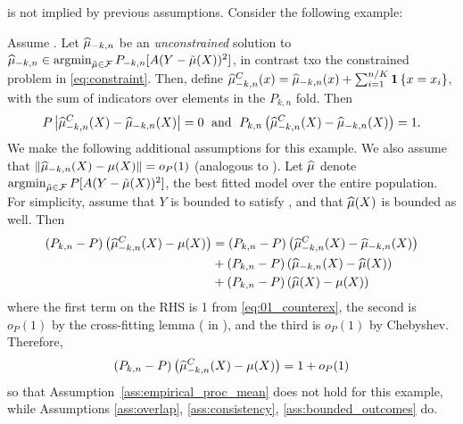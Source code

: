  is not implied by previous assumptions. Consider the following example: 

\begin{example}\label{ex:ass_D}
Assume .
Let $\widehat{\mu}_{-k,n}$ be an \emph{unconstrained} solution to
$\widehat{\mu}_{-k,n}\in \mathop{\rm argmin}_{\tilde\mu\in\mathcal F} P_{-k,n}[A(Y-\tilde \mu(X))^2]$,
in contrast txo the constrained problem in \eqref{eq:constraint}. 
Then, define 
$\widehat{\mu}^C_{-k,n}(x)=\widehat{\mu}_{-k,n}(x)+\sum_{i=1}^{n/K} \mathbf{1} \left\{x=x_i\right\}$, with the sum of indicators over elements in the $P_{k,n}$ fold.
Then 
\begin{align}
\label{eq:01_counterex}
    P\left|\widehat{\mu}^C_{-k,n}(X)-\widehat{\mu}_{-k,n}(X)\right|=0\;\text{ and } \;
P_{k,n}\left(\widehat{\mu}^C_{-k,n}(X)-\widehat{\mu}_{-k,n}(X)\right)=1.
\end{align}
We make the following additional assumptions for this example. 
We also assume that $\|\widehat{\mu}_{-k,n}(X)-\mu(X)\|=o_P(1)$ (analogous to ).
Let $\widehat{\mu}$ denote $\mathop{\rm argmin}_{\tilde \mu\in\mathcal F} P[A(Y-\tilde\mu(X))^2]$, the best fitted model over the entire population. For simplicity, assume that $Y$ is bounded to satisfy , and that $\widehat{\mu}(X)$ is bounded as well. Then
\vspace{-0.7em}
\begin{align*}
(P_{k,n}-P)\left(\widehat{\mu}^C_{-k,n}(X)-\mu(X)\right)&=
(P_{k,n}-P)\left(\widehat{\mu}^C_{-k,n}(X)-\widehat{\mu}_{-k,n}(X)\right)
\\&+
(P_{k,n}-P)\left(\widehat{\mu}_{-k,n}(X)-\widehat{\mu}(X)\right)\\
&+(P_{k,n}-P)\left(\widehat{\mu}(X)-\mu(X)\right)  
\end{align*}
where the first term on the RHS is 1 from \eqref{eq:01_counterex}, the second is $o_P(1)$ by the cross-fitting lemma ( in ), and the third is $o_P(1)$ by Chebyshev. 
Therefore, 
\vspace{-0.7em}
$$(P_{k,n}-P)\left(\widehat{\mu}^C_{-k,n}(X)-\mu(X)\right)=1+o_P(1)$$
so that 
Assumption~\ref{ass:empirical_proc_mean} does not hold for this example, while Assumptions \ref{ass:overlap}, \ref{ass:consistency}, \ref{ass:bounded_outcomes} do. 
\end{example}
\label{sec:ass_d_note-end}
\ifdefined\response\newpage\newpage\clearpage\pagebreak\else\fi
